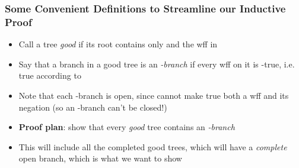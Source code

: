 \begin{frame}
\frametitle{Some Convenient Definitions to Streamline our Inductive Proof}

\begin{itemize}[<+->]

\item Call a tree \emph{good} if its root contains only \enot\THA and the wff in \GA

\item Say that a branch in a good tree is an \emph{-branch} if every wff on it is -true, i.e. true according to 

\item Note that each -branch is open, since  cannot make true both a wff and its negation (so an -branch can't be closed!)

\item \textbf{Proof plan}: show that every \emph{good} tree contains an \emph{-branch}

\item This will include all the completed good trees, which will have a \textit{complete} open branch, which is what we want to show

\end{itemize}
\end{frame}

